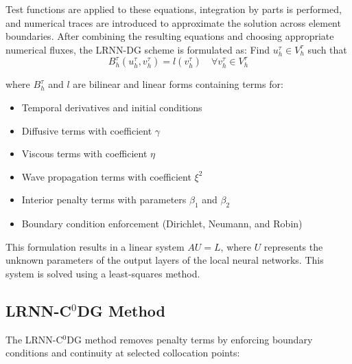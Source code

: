 \documentclass[11pt,a4paper]{article}
\begin{document}
Test functions are applied to these equations, integration by parts is performed, and numerical traces are introduced to approximate the solution across element boundaries. After combining the resulting equations and choosing appropriate numerical fluxes, the LRNN-DG scheme is formulated as: Find $u_h^\tau \in V_h^\tau$ such that
\begin{equation}
B_h^\tau(u_h^\tau, v_h^\tau) = l(v_h^\tau) \quad \forall v_h^\tau \in V_h^\tau
\end{equation}

where $B_h^\tau$ and $l$ are bilinear and linear forms containing terms for:
\begin{itemize}
    \item Temporal derivatives and initial conditions
    \item Diffusive terms with coefficient $\gamma$
    \item Viscous terms with coefficient $\eta$
    \item Wave propagation terms with coefficient $\xi^2$
    \item Interior penalty terms with parameters $\beta_1$ and $\beta_2$
    \item Boundary condition enforcement (Dirichlet, Neumann, and Robin)
\end{itemize}

This formulation results in a linear system $AU = L$, where $U$ represents the unknown parameters of the output layers of the local neural networks. This system is solved using a least-squares method.

\subsection{LRNN-C$^0$DG Method}

The LRNN-C$^0$DG method removes penalty terms by enforcing boundary conditions and continuity at selected collocation points:
\end{document}
